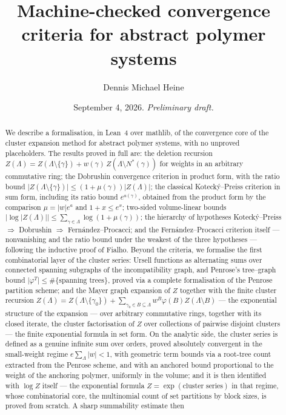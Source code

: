 \documentclass[11pt]{amsart}
\title[Machine-checked convergence criteria]{Machine-checked convergence
criteria for abstract polymer systems}
\author{Dennis Michael Heine}
\date{September 4, 2026. \emph{Preliminary draft.}}
\begin{document}
\begin{abstract}
We describe a formalisation, in Lean~4 over \textsf{mathlib}, of the
convergence core of the cluster expansion method for abstract polymer
systems, with no unproved placeholders. The results proved in full are: the
deletion recursion
$Z(\Lambda) = Z(\Lambda \setminus \{\gamma\}) + w(\gamma)\,
Z(\Lambda \setminus N^*(\gamma))$ for weights in an arbitrary commutative
ring; the Dobrushin convergence criterion in product form, with the ratio
bound $\lvert Z(\Lambda \setminus \{\gamma\})\rvert \le (1 + \mu(\gamma))
\lvert Z(\Lambda)\rvert$; the classical Kotecký--Preiss criterion in sum
form, including its ratio bound $e^{a(\gamma)}$, obtained from the product
form by the comparison $\mu = \lvert w\rvert e^{a}$ and $1 + x \le e^{x}$;
two-sided volume-linear bounds
$\lvert \log \lvert Z(\Lambda)\rvert \rvert \le \sum_{\gamma \in \Lambda}
\log(1 + \mu(\gamma))$; the hierarchy of hypotheses
Kotecký--Preiss $\Rightarrow$ Dobrushin $\Rightarrow$ Fernández--Procacci;
and the Fernández--Procacci criterion itself — nonvanishing and the ratio
bound under the weakest of the three hypotheses — following the inductive
proof of Fialho. Beyond the criteria, we formalise the first
combinatorial layer of the cluster series: Ursell functions as
alternating sums over connected spanning subgraphs of the
incompatibility graph, and Penrose's tree--graph bound
$\lvert \varphi^{T} \rvert \le \#\{\text{spanning trees}\}$, proved via a
complete formalisation of the Penrose partition scheme; and the Mayer
graph expansion of $Z$ together with the finite cluster recursion
$Z(\Lambda) = Z(\Lambda \setminus \{\gamma_0\})
+ \sum_{\gamma_0 \in B \subseteq \Lambda} w^{B} \varphi(B)
Z(\Lambda \setminus B)$ — the exponential structure of the expansion —
over arbitrary commutative rings, together with its closed iterate, the
cluster factorisation of $Z$ over collections of pairwise disjoint
clusters — the finite exponential formula in set form. On the analytic
side, the cluster series is defined as a genuine infinite sum over
orders, proved absolutely convergent in the small-weight regime
$e \sum_{\Lambda} \lvert w \rvert < 1$, with geometric term bounds via a
root-tree count extracted from the Penrose scheme, and with an anchored
bound proportional to the weight of the anchoring polymer, uniformly in
the volume; and it is then identified with $\log Z$ itself — the
exponential formula $Z = \exp(\text{cluster series})$ in that regime,
whose combinatorial core, the multinomial count of set partitions by
block sizes, is proved from scratch. A sharp summability estimate then

\end{abstract}
\end{document}
